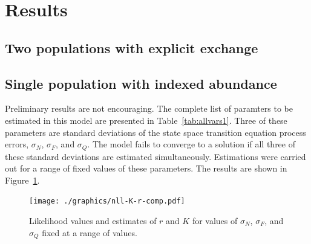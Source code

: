 \documentclass[12pt,letterpaper,twoside]{article}
\newcommand\help[1]{\color{Magenta}{\it #1 }\normalcolor}
\begin{document}
\section{Results}
\subsection{Two populations with explicit exchange}
\help{Preliminary results of the two population model were presented
in a previous report. More work has been done on model interpretation
and these previous results need revision.}

\subsection{Single population with indexed abundance}
Preliminary results are not encouraging.
The complete list of paramters to be estimated in this model are
presented in Table~\ref{tab:allvars1}. Three of these parameters are
standard deviations of the state space transition equation process
errors, $\sigma_N$, $\sigma_F$, and $\sigma_Q$. 
The model fails to converge to a solution if 
all three of these standard deviations are estimated simultaneously.
Estimations were carried out for a range of fixed values of
these parameters. The results are shown in
Figure~\ref{fig:nll-K-r.CV}.

\begin{figure}
\begin{center}
\texttt{[image: ./graphics/nll-K-r-comp.pdf]}
\caption{\label{fig:nll-K-r.CV}
Likelihood values and estimates of $r$ and $K$ for values of 
$\sigma_N$, $\sigma_F$, and $\sigma_Q$ fixed at a range of values. 
}
\end{center}
\end{figure}




\end{document}
